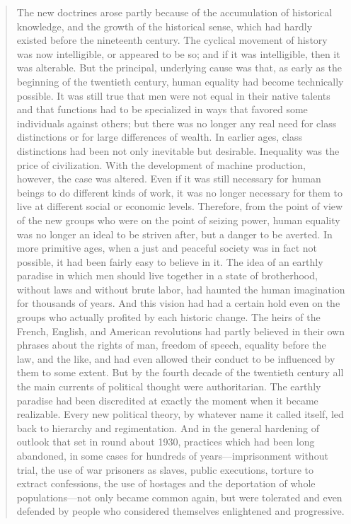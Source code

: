 \begin{quotation}
The new doctrines arose partly because of the accumulation of historical
knowledge, and the growth of the historical sense, which had hardly
existed before the nineteenth century. The cyclical movement of history
was now intelligible, or appeared to be so; and if it was intelligible,
then it was alterable. But the principal, underlying cause was that, as
early as the beginning of the twentieth century, human equality had
become technically possible. It was still true that men were not equal
in their native talents and that functions had to be specialized in ways
that favored some individuals against others; but there was no longer
any real need for class distinctions or for large differences of wealth.
In earlier ages, class distinctions had been not only inevitable but
desirable. Inequality was the price of civilization. With the
development of machine production, however, the case was altered. Even
if it was still necessary for human beings to do different kinds of
work, it was no longer necessary for them to live at different social or
economic levels. Therefore, from the point of view of the new groups who
were on the point of seizing power, human equality was no longer an
ideal to be striven after, but a danger to be averted. In more primitive
ages, when a just and peaceful society was in fact not possible, it had
been fairly easy to believe in it. The idea of an earthly paradise in
which men should live together in a state of brotherhood, without laws
and without brute labor, had haunted the human imagination for thousands
of years. And this vision had had a certain hold even on the groups who
actually profited by each historic change. The heirs of the French,
English, and American revolutions had partly believed in their own
phrases about the rights of man, freedom of speech, equality before the
law, and the like, and had even allowed their conduct to be influenced
by them to some extent. But by the fourth decade of the twentieth
century all the main currents of political thought were authoritarian.
The earthly paradise had been discredited at exactly the moment when it
became realizable. Every new political theory, by whatever name it
called itself, led back to hierarchy and regimentation. And in the
general hardening of outlook that set in round about 1930, practices
which had been long abandoned, in some cases for hundreds of
years---imprisonment without trial, the use of war prisoners as slaves,
public executions, torture to extract confessions, the use of hostages
and the deportation of whole populations---not only became common again,
but were tolerated and even defended by people who considered themselves
enlightened and progressive.


\end{quotation}

